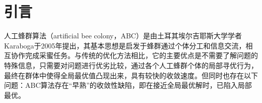 \documentclass[a4paper,12pt]{report}
\begin{document}
\tableofcontents %


\chapter{引言}
\setcounter{page}{1}

\begin{spacing}{1.5}
	人工蜂群算法（artificial bee colony，ABC）是由土耳其埃尔吉耶斯大学学者Karaboga于2005年提出，其基本思想是启发于蜂群通过个体分工和信息交流，相互协作完成采蜜任务。与传统的优化方法相比，它的主要优点是不需要了解问题的特殊信息，只需要对问题进行优劣比较，通过各个人工蜂群个体的局部寻优行为，最终在群体中使得全局最优值凸现出来，具有较快的收敛速度。但同时也存在以下问题：ABC算法存在“早熟”的收敛性缺陷，即在接近全局最优解时，已陷入局部最优。

\end{spacing}
\end{document}
